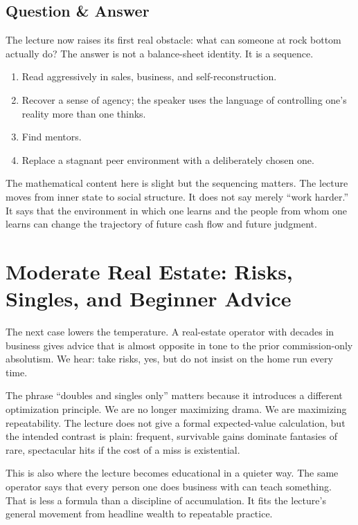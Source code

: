 \subsection{Question \& Answer}

The lecture now raises its first real obstacle: what can someone at rock bottom actually do? The answer is not a balance-sheet identity. It is a sequence.

\begin{enumerate}
\item Read aggressively in sales, business, and self-reconstruction.
\item Recover a sense of agency; the speaker uses the language of controlling one's reality more than one thinks.
\item Find mentors.
\item Replace a stagnant peer environment with a deliberately chosen one.
\end{enumerate}

The mathematical content here is slight but the sequencing matters. The lecture moves from inner state to social structure. It does not say merely ``work harder.'' It says that the environment in which one learns and the people from whom one learns can change the trajectory of future cash flow and future judgment.

\section{Moderate Real Estate: Risks, Singles, and Beginner Advice}

The next case lowers the temperature. A real-estate operator with decades in business gives advice that is almost opposite in tone to the prior commission-only absolutism. We hear: take risks, yes, but do not insist on the home run every time.

The phrase ``doubles and singles only'' matters because it introduces a different optimization principle. We are no longer maximizing drama. We are maximizing repeatability. The lecture does not give a formal expected-value calculation, but the intended contrast is plain: frequent, survivable gains dominate fantasies of rare, spectacular hits if the cost of a miss is existential.

This is also where the lecture becomes educational in a quieter way. The same operator says that every person one does business with can teach something. That is less a formula than a discipline of accumulation. It fits the lecture's general movement from headline wealth to repeatable practice.

